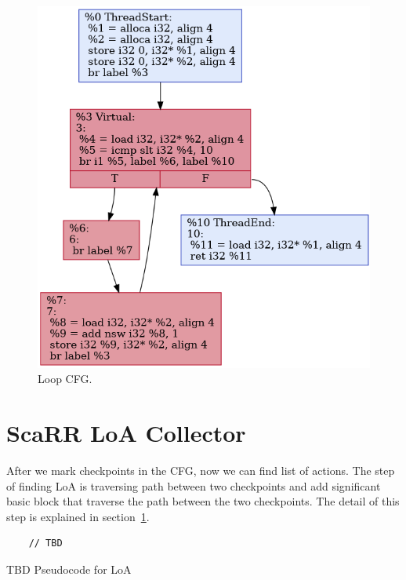 \begin{figure}[htbp]
    \centerline{\includegraphics[scale=.70]{Figures/04/simple-loop-checkpoints.png}}
    \caption{Loop CFG.}
    \label{fig:simple-loop-checkpoints}
\end{figure}

\section{ScaRR LoA Collector}
\label{sec:scarr-loa-collector}

After we mark
checkpoints in the CFG, now we can find list of actions. The step of finding LoA
is traversing path between two checkpoints and add significant basic block that
traverse the path between the two checkpoints. The detail of this step is
explained in section~\ref{sec:scarr-loa-collector}.


\begin{listing}[htbp]
    \begin{verbatim}
    // TBD
    \end{verbatim}
    \caption{TBD Pseudocode for LoA}
    \label{listing:loa-pseudocode}
\end{listing}

